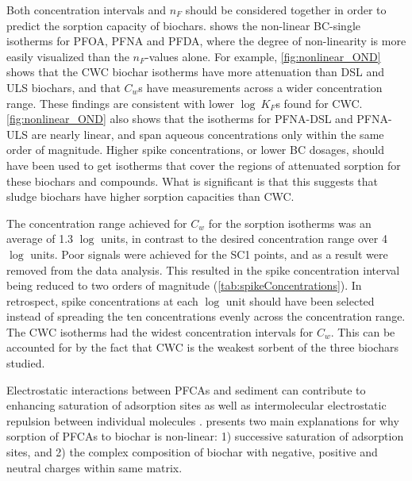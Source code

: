 Both concentration intervals and $n_F$ should be considered together in order to predict the sorption capacity of biochars.  shows the non-linear BC-single isotherms for PFOA, PFNA and PFDA, where the degree of non-linearity is more easily visualized than the $n_F$-values alone. For example, \cref{fig:nonlinear_OND} shows that the CWC biochar isotherms have more attenuation than DSL and ULS biochars, and that $C_w$s have measurements across a wider concentration range. These findings are consistent with lower $\log~K_F$s found for CWC. \cref{fig:nonlinear_OND} also shows that the isotherms for PFNA-DSL and PFNA-ULS are nearly linear, and span aqueous concentrations only within the same order of magnitude. Higher spike concentrations, or lower BC dosages, should have been used to get isotherms that cover the regions of attenuated sorption for these biochars and compounds. What is significant is that this suggests that sludge biochars have higher sorption capacities than CWC.

The concentration range achieved for $C_w$ for the sorption isotherms was an average of 1.3 $\log$ units, in contrast to the desired concentration range over 4 $\log$ units. Poor signals were achieved for the SC1 points, and as a result were removed from the data analysis. This resulted in the spike concentration interval being reduced to two orders of magnitude (\cref{tab:spikeConcentrations}). In retrospect, spike concentrations at each $\log$ unit should have been selected instead of spreading the ten concentrations evenly across the concentration range. The CWC isotherms had the widest concentration intervals for $C_w$. This can be accounted for by the fact that CWC is the weakest sorbent of the three biochars studied.  

Electrostatic interactions between PFCAs and sediment can contribute to enhancing saturation of adsorption sites as well as intermolecular electrostatic repulsion between individual molecules \citep{higgins2006sorption,yin2022insights}. \cite{yin2022insights} presents two main explanations for why sorption of PFCAs to biochar is non-linear: 1) successive saturation of adsorption sites, and 2) the complex composition of biochar with negative, positive and neutral charges within same matrix. 

